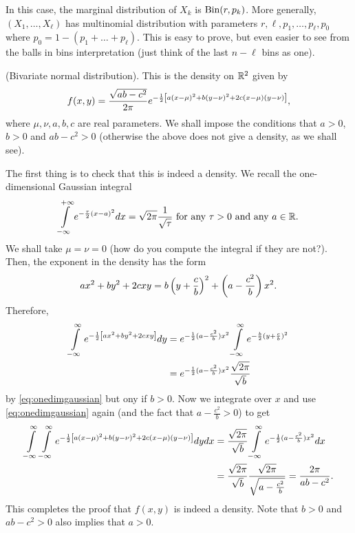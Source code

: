 \documentclass[preprint,  11pt]{amsart}
\begin{document}
In this case, the marginal distribution of $X_{k}$ is $\mbox{Bin}(r,p_{k})$. More generally, $(X_{1},\ldots ,X_{\ell})$ has multinomial distribution with parameters $r,\ell,p_{1},\ldots ,p_{\ell},p_{0}$ where $p_{0}=1-(p_{1}+\ldots +p_{\ell})$. This is easy to prove, but even easier to see from the balls in bins interpretation (just think of the last $n-\ell$ bins as one).
\eeg

\beg (Bivariate normal distribution). This is the density on $\mathbb{R}^{2}$ given by
$$
f(x,y)=\frac{\sqrt{ab-c^{2}}}{2\pi}e^{-\frac{1}{2}\left[a(x-\mu)^{2}+b(y-\nu)^{2}+2c(x-\mu)(y-\nu) \right]},
$$
where $\mu,\nu,a,b,c$ are real parameters. We shall impose the conditions that $a>0$, $b>0$ and $ab-c^{2}>0$ (otherwise the above does not give a density, as we shall see).

The first thing is to check that this is indeed a density. We recall the one-dimensional Gaussian integral 
\begin{equation}\label{eq:onedimgaussian}
\int\limits_{-\infty}^{+\infty}e^{-\frac{\tau}{2}(x-a)^{2}}dx = \sqrt{2\pi}\frac{1}{\sqrt{\tau}} \mbox{ for any }\tau>0 \mbox{ and any }a\in \mathbb{R}.
\end{equation}
We shall take $\mu=\nu=0$ (how do you compute the integral  if they are not?). Then, the exponent in the density has the form
$$
ax^{2}+by^{2}+2cxy = b\left(y+\frac{c}{b}\right)^{2}+\left(a-\frac{c^{2}}{b}\right)x^{2}.
$$
Therefore, 
\begin{align*}
\int\limits_{-\infty}^{\infty}e^{-\frac{1}{2}\left[ax^{2}+by^{2}+2cxy \right]} dy &= e^{-\frac{1}{2}(a-\frac{c^{2}}{b})x^{2}} \int\limits_{-\infty}^{\infty}e^{-\frac{b}{2}(y+\frac{c}{b})^{2}} \\
&= e^{-\frac{1}{2}(a-\frac{c^{2}}{b})x^{2}}\frac{\sqrt{2\pi}}{\sqrt{b}}
\end{align*}
by \eqref{eq:onedimgaussian} but ony if $b>0$. Now we integrate over $x$ and use \eqref{eq:onedimgaussian} again (and the fact that $a-\frac{c^{2}}{b}>0$) to get
\begin{align*}
\int\limits_{-\infty}^{\infty}\int\limits_{-\infty}^{\infty}e^{-\frac{1}{2}\left[a(x-\mu)^{2}+b(y-\nu)^{2}+2c(x-\mu)(y-\nu) \right]}dydx &= \frac{\sqrt{2\pi}}{\sqrt{b}} \int\limits_{-\infty}^{\infty} e^{-\frac{1}{2}(a-\frac{c^{2}}{b})x^{2}}dx \\
&= \frac{\sqrt{2\pi}}{\sqrt{b}} \frac{\sqrt{2\pi}}{\sqrt{a-\frac{c^{2}}{b}}} = \frac{2\pi}{ab-c^{2}}.
\end{align*}
This completes the proof that $f(x,y)$ is indeed a density. Note that $b>0$ and $ab-c^{2}>0$ also implies that $a>0$.
\eeg
\end{document}
